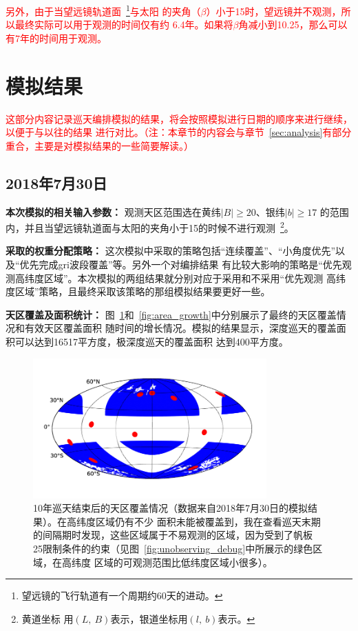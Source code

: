 \documentclass[a4paper,11pt]{ctexart}
\def\blankpage{%
      \clearpage%
      \thispagestyle{empty}%
      \addtocounter{page}{-1}%
      \null%
      \clearpage}
\newcommand{\RT}[1]{\textcolor{red}{#1}}
\begin{document}
\RT{\heiti 另外，由于当望远镜轨道面~\footnote{望远镜的飞行轨道有一个周期约60天的进动。}与太阳
的夹角（$\beta$）小于15\textdegree 时，望远镜并不观测，所以最终实际可以用于观测的时间仅有约
6.4年。如果将$\beta$角减小到10.25\textdegree，那么可以有7年的时间用于观测。}

\blankpage
\section{模拟结果}

\RT{\heiti 这部分内容记录巡天编排模拟的结果，将会按照模拟进行日期的顺序来进行继续，以便于与以往的结果
进行对比。（注：本章节的内容会与章节~\ref{sec:analysis}有部分重合，主要是对模拟结果的一些简要解读。）}

\subsection{2018年7月30日}
\textbf{本次模拟的相关输入参数：}
观测天区范围选在黄纬$|B|\ge 20$\textdegree 、银纬$|b|\ge 17$\textdegree
的范围内，并且当望远镜轨道面与太阳的夹角小于15\textdegree 的时候不进行观测~\footnote{黄道坐标
用$(L,~B)$表示，银道坐标用$(l,~b)$表示。}。

\textbf{采取的权重分配策略：}
这次模拟中采取的策略包括“连续覆盖”、“小角度优先”以及“优先完成gri波段覆盖”等。另外一个对编排结果
有比较大影响的策略是“优先观测高纬度区域”。本次模拟的两组结果就分别对应于采用和不采用“优先观测
高纬度区域”策略，且最终采取该策略的那组模拟结果要更好一些。

\textbf{天区覆盖及面积统计：}
图~\ref{fig:covered_sky}和~\ref{fig:area_growth}中分别展示了最终的天区覆盖情况和有效天区覆盖面积
随时间的增长情况。模拟的结果显示，深度巡天的覆盖面积可以达到16517平方度，极深度巡天的覆盖面积
达到400平方度。

\begin{figure}[h!]
\centering
\includegraphics[width=0.8\textwidth]{figures/covered_sky.png}
\caption{10年巡天结束后的天区覆盖情况（数据来自2018年7月30日的模拟结果）。在高纬度区域仍有不少
面积未能被覆盖到，我在查看巡天末期的间隔期时发现，这些区域属于不易观测的区域，因为受到了帆板
25\textdegree 限制条件的约束（见图~\ref{fig:unobserving_debug}中所展示的绿色区域，在高纬度
区域的可观测范围比低纬度区域小很多）。}
\label{fig:covered_sky}
\end{figure}
\end{document}
